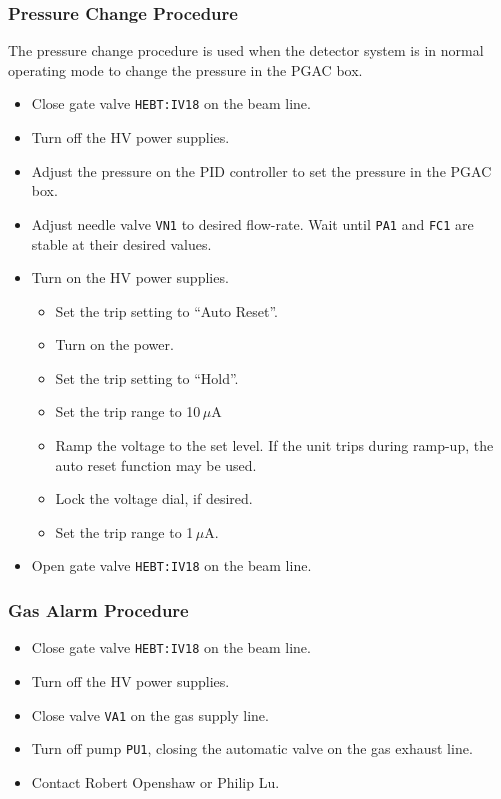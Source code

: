 \subsubsection{Pressure Change Procedure}
The pressure change procedure is used when the detector system is in normal operating mode to change the pressure in the PGAC box.
\begin{itemize}
\setlength{\itemsep}{0pt}
\setlength{\parskip}{0pt}
\setlength{\parsep}{0pt}
\item Close gate valve \texttt{HEBT:IV18} on the beam line.
\item Turn off the HV power supplies.
\item Adjust the pressure on the PID controller to set the pressure in the PGAC box.
\item Adjust needle valve \texttt{VN1} to desired flow-rate.  Wait until \texttt{PA1} and \texttt{FC1} are stable at their desired values.
\item Turn on the HV power supplies.
\begin{itemize}
\setlength{\itemsep}{0pt}
\setlength{\parskip}{0pt}
\setlength{\parsep}{0pt}
\item Set the trip setting  to ``Auto Reset''.
\item Turn on the power.
\item Set the trip setting to ``Hold''.
\item Set the trip range to 10\,$\mu$A
\item Ramp the voltage to the set level.  If the unit trips during ramp-up, the auto reset function may be used. 
\item Lock the voltage dial, if desired.
\item Set the trip range to 1\,$\mu$A.
\end{itemize}

\item Open gate valve \texttt{HEBT:IV18} on the beam line.
\end{itemize}
\subsubsection{Gas Alarm Procedure}
\begin{itemize}
\setlength{\itemsep}{0pt}
\setlength{\parskip}{0pt}
\setlength{\parsep}{0pt}

\item Close gate valve \texttt{HEBT:IV18} on the beam line.
\item Turn off the HV power supplies.
\item Close valve \texttt{VA1} on the gas supply line.
\item Turn off pump \texttt{PU1}, closing the automatic valve on the gas exhaust line.
\item Contact Robert Openshaw or Philip Lu.
\end{itemize}
